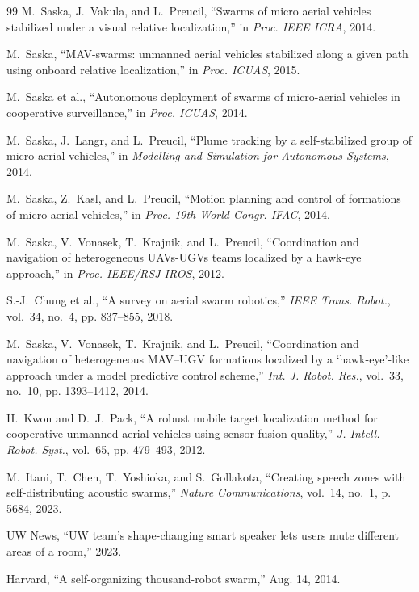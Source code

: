 \documentclass[letterpaper, 10pt, conference]{IEEEtran}
\begin{document}
\begin{thebibliography}{99}
M.~Saska, J.~Vakula, and L.~Preucil, ``Swarms of micro aerial vehicles stabilized under a visual relative localization,'' in \emph{Proc. IEEE ICRA}, 2014.

M.~Saska, ``{MAV}-swarms: unmanned aerial vehicles stabilized along a given path using onboard relative localization,'' in \emph{Proc. ICUAS}, 2015.

M.~Saska et al., ``Autonomous deployment of swarms of micro-aerial vehicles in cooperative surveillance,'' in \emph{Proc. ICUAS}, 2014.

M.~Saska, J.~Langr, and L.~Preucil, ``Plume tracking by a self-stabilized group of micro aerial vehicles,'' in \emph{Modelling and Simulation for Autonomous Systems}, 2014.

M.~Saska, Z.~Kasl, and L.~Preucil, ``Motion planning and control of formations of micro aerial vehicles,'' in \emph{Proc. 19th World Congr. IFAC}, 2014.

M.~Saska, V.~Vonasek, T.~Krajnik, and L.~Preucil, ``Coordination and navigation of heterogeneous {UAV}s-{UGV}s teams localized by a hawk-eye approach,'' in \emph{Proc. IEEE/RSJ IROS}, 2012.

S.-J.~Chung et al., ``A survey on aerial swarm robotics,'' \emph{IEEE Trans. Robot.}, vol.~34, no.~4, pp. 837--855, 2018.

M.~Saska, V.~Vonasek, T.~Krajnik, and L.~Preucil, ``Coordination and navigation of heterogeneous {MAV}–{UGV} formations localized by a ‘hawk-eye’-like approach under a model predictive control scheme,'' \emph{Int. J. Robot. Res.}, vol.~33, no.~10, pp. 1393--1412, 2014.

H.~Kwon and D.~J.~Pack, ``A robust mobile target localization method for cooperative unmanned aerial vehicles using sensor fusion quality,'' \emph{J. Intell. Robot. Syst.}, vol.~65, pp. 479--493, 2012.

M.~Itani, T.~Chen, T.~Yoshioka, and S.~Gollakota, ``Creating speech zones with self-distributing acoustic swarms,'' \emph{Nature Communications}, vol.~14, no.~1, p. 5684, 2023.

UW News, ``{UW} team's shape-changing smart speaker lets users mute different areas of a room,'' 2023.

Harvard, ``A self-organizing thousand-robot swarm,'' Aug. 14, 2014.


\end{thebibliography}
\end{document}
